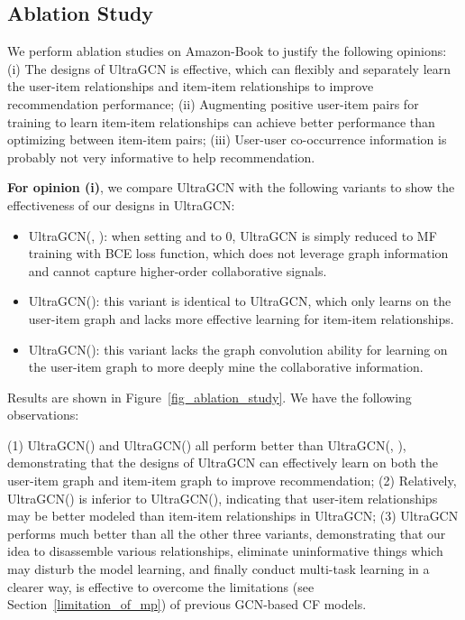 \documentclass[sigconf,authorversion]{acmart}
\begin{document}
\subsection{Ablation Study}
\label{sec::ablation_study}
We perform ablation studies on Amazon-Book to justify the following opinions:
(i) The designs of UltraGCN is effective, which can flexibly and separately learn the user-item relationships and item-item relationships to improve recommendation performance;
(ii) Augmenting positive user-item pairs for training to learn item-item relationships can achieve better performance than optimizing between item-item pairs; 
(iii) User-user co-occurrence information is probably not very informative to help recommendation.

\textbf{For opinion (i)}, we compare UltraGCN with the following variants to show the effectiveness of our designs in UltraGCN:
\begin{itemize}
	\item UltraGCN(, ): when setting  and  to 0, UltraGCN is simply reduced to MF training with BCE loss function, which does not leverage graph information and cannot capture higher-order collaborative signals.
	\item UltraGCN(): this variant is identical to UltraGCN, which only learns on the user-item graph and lacks more effective learning for item-item relationships.
	\item UltraGCN(): this variant lacks the graph convolution ability for learning on the user-item graph to more deeply mine the collaborative information.
\end{itemize}
Results are shown in Figure~\ref{fig_ablation_study}. We have the following observations:

(1) UltraGCN() and UltraGCN() all perform better than UltraGCN(, ), demonstrating that the designs of UltraGCN can effectively learn on both the user-item graph and item-item graph to improve recommendation;
(2) Relatively, UltraGCN() is inferior to UltraGCN(), indicating that  
user-item relationships may be better modeled than item-item relationships in UltraGCN;
(3) UltraGCN performs much better than all the other three variants, demonstrating that our idea to disassemble various relationships, eliminate uninformative things which may disturb the model learning, and finally conduct multi-task learning in a clearer way, is effective to overcome the limitations (see Section~\ref{limitation_of_mp}) of previous GCN-based CF models. 
\end{document}
